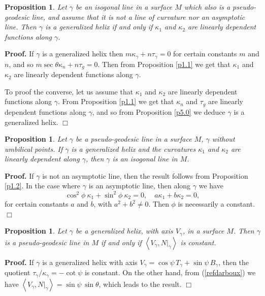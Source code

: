 \documentclass[11pt,a4paper]{article}
\def\<{\left<}
\def\>{\right>}
\def\g{\gamma}
\newenvironment{proof}{\ignorespaces\par\noindent\textbf{Proof.}\quad}{\hfill$\Box$\par}
\newtheorem{prop}[theo]{Proposition}
\begin{document}
\begin{prop}\label{p5.1}
Let $\g$ be an isogonal line in a surface $M$ which also is a pseudo-geodesic line, and assume that it is not a line of curvature nor an asymptotic line. Then $\g$ is a generalized helix if and only if $\kappa_1$ and $\kappa_2$ are linearly dependent functions along $\g$.
\end{prop}
\begin{proof}
If $\g$ is a generalized helix then $m\kappa_\g+n\tau_\g=0$ for certain constants $m$ and $n$, and so $m\sec\theta \kappa_n+n\tau_g=0$. Then from Proposition \ref{p1.1} we get that $\kappa_1$ and $\kappa_2$ are linearly dependent functions along $\g$.

To proof the converse, let us assume that $\kappa_1$ and $\kappa_2$ are linearly dependent functions along $\g$. From Proposition \ref{p1.1} we get that $\kappa_n$ and $\tau_g$ are linearly dependent functions along $\g$, and so from Proposition \ref{p5.0} we deduce $\g$ is a generalized helix.
\end{proof}

\begin{prop}\label{p5.2}
Let $\g$ be a pseudo-geodesic line in a surface $M$, $\g$ without umbilical points. If $\g$ is a generalized helix and the curvatures $\kappa_1$ and $\kappa_2$ are linearly dependent along $\g$, then $\g$ is an isogonal line in $M$.
\end{prop}
\begin{proof}
If $\g$ is not an asymptotic line, then the result follows from Proposition \ref{p1.2}. In the case where $\g$ is an asymptotic line, then along $\g$ we have
\[
\cos^2\phi\ \kappa_1+\sin^2\phi\ \kappa_2=0,\quad a\kappa_1+b\kappa_2=0,
\]
for certain constants $a$ and $b$, with $a^2+b^2\neq0$. Then $\phi$ is necessarily a constant.
\end{proof}

\begin{prop}\label{hg1}
Let $\gamma$ be a generalized helix, with axis $V_\gamma$, in a surface $M$. Then
$\gamma$ is a pseudo-geodesic line in $M$ if and only if $\<V_\gamma,N|_\gamma\>$ is constant.
\end{prop}
\begin{proof}
If $\gamma$ is a generalized helix with axis $V_\gamma=\cos\psi\,T_\gamma+\sin\psi\,B_\gamma$, then the quotient $\tau_\gamma/\kappa_\gamma=-\cot\psi$ is constant. On the other hand, from (\ref{refdarboux}) we have $\<V_\gamma,N|_\gamma\>=\sin\psi\,\sin\theta$, which leads to the result.
\end{proof}
\bigskip
\end{document}
